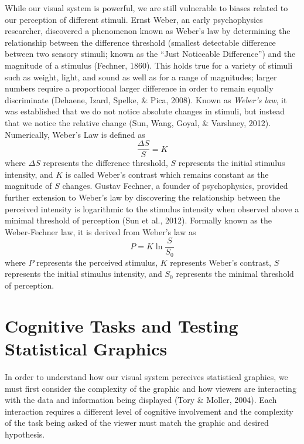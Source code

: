 \documentclass[print]{nuthesis}
\begin{document}
While our visual system is powerful, we are still vulnerable to biases related to our perception of different stimuli.
Ernst Weber, an early psychophysics researcher, discovered a phenomenon known as Weber's law by determining the relationship between the difference threshold (smallest detectable difference between two sensory stimuli; known as the ``Just Noticeable Difference'') and the magnitude of a stimulus (Fechner, 1860).
This holds true for a variety of stimuli such as weight, light, and sound as well as for a range of magnitudes; larger numbers require a proportional larger difference in order to remain equally discriminate (Dehaene, Izard, Spelke, \& Pica, 2008).
Known as \emph{Weber's law}, it was established that we do not notice absolute changes in stimuli, but instead that we notice the relative change (Sun, Wang, Goyal, \& Varshney, 2012).
Numerically, Weber's Law is defined as
\begin{equation}
\frac{\Delta S}{S} = K
\end{equation}
where \(\Delta S\) represents the difference threshold, \(S\) represents the initial stimulus intensity, and \(K\) is called Weber's contrast which remains constant as the magnitude of \(S\) changes.
Gustav Fechner, a founder of psychophysics, provided further extension to Weber's law by discovering the relationship between the perceived intensity is logarithmic to the stimulus intensity when observed above a minimal threshold of perception (Sun et al., 2012).
Formally known as the Weber-Fechner law, it is derived from Weber's law as
\begin{equation}
P = K\ln \frac{S}{S_0}
\end{equation}
where \(P\) represents the perceived stimulus, \(K\) represents Weber's contrast, \(S\) represents the initial stimulus intensity, and \(S_0\) represents the minimal threshold of perception.

\hypertarget{cognitive-tasks-and-testing-statistical-graphics}{%
\section{Cognitive Tasks and Testing Statistical Graphics}\label{cognitive-tasks-and-testing-statistical-graphics}}

In order to understand how our visual system perceives statistical graphics, we must first consider the complexity of the graphic and how viewers are interacting with the data and information being displayed (Tory \& Moller, 2004).
Each interaction requires a different level of cognitive involvement and the complexity of the task being asked of the viewer must match the graphic and desired hypothesis.
\end{document}

